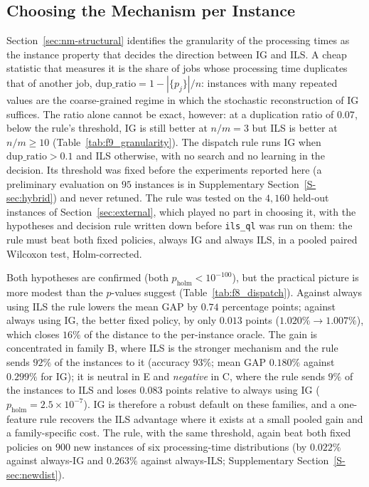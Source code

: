 \documentclass[final,3p,times,11pt,authoryear]{elsarticle}
\begin{document}
\subsection{Choosing the Mechanism per Instance}
\label{sec:dispatch}

Section~\ref{sec:nm-structural} identifies the granularity of the
processing times as the instance property that decides the direction
between IG and ILS. A cheap statistic that measures it is the share of jobs whose
processing time duplicates that of another job,
$\mathrm{dup\_ratio} = 1 - |\{p_j\}|/n$: instances with many repeated
values are the coarse-grained regime in which the stochastic
reconstruction of IG suffices. The ratio alone cannot be exact, however:
at a duplication ratio of $0.07$, below the rule's threshold, IG is still
better at $n/m=3$ but ILS is better at $n/m \geq 10$
(Table~\ref{tab:f9_granularity}). The dispatch rule runs IG when
$\mathrm{dup\_ratio} > 0.1$ and ILS otherwise, with no search and no
learning in the decision. Its threshold was fixed before the
experiments reported here (a preliminary evaluation on $95$ instances
is in Supplementary Section~\ref{S-sec:hybrid}) and never retuned. The
rule was tested on the $4{,}160$ held-out instances of
Section~\ref{sec:external}, which played no part in choosing it, with
the hypotheses and decision rule written down before \texttt{ils\_ql}
was run on them: the rule must beat both fixed policies, always IG and
always ILS, in a pooled paired Wilcoxon test, Holm-corrected.

Both hypotheses are confirmed (both $p_{\mathrm{holm}} < 10^{-100}$),
but the practical picture is more modest than the $p$-values suggest
(Table~\ref{tab:f8_dispatch}). Against always using ILS the rule lowers
the mean GAP by $0.74$ percentage points; against always using IG, the
better fixed policy, by only $0.013$ points ($1.020\% \to 1.007\%$),
which closes $16\%$ of the distance to the per-instance oracle. The
gain is concentrated in family B, where ILS is the stronger mechanism
and the rule sends $92\%$ of the instances to it (accuracy $93\%$; mean
GAP $0.180\%$ against $0.299\%$ for IG); it is neutral in E and
\emph{negative} in C, where the rule sends $9\%$ of the instances to ILS
and loses $0.083$ points relative to always using IG
($p_{\mathrm{holm}} = 2.5 \times 10^{-7}$). IG is therefore a robust
default on these families, and a one-feature rule recovers the ILS
advantage where it exists at a small pooled gain and a family-specific
cost. The rule, with the same threshold, again beat both fixed policies
on $900$ new instances of six processing-time distributions (by $0.022\%$
against always-IG and $0.263\%$ against always-ILS; Supplementary
Section~\ref{S-sec:newdist}).
\end{document}
